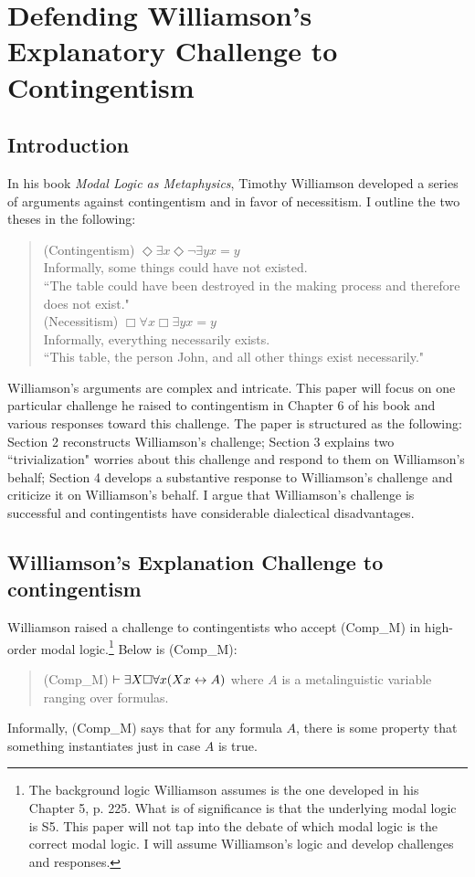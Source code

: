 \chapter{Defending Williamson's Explanatory Challenge to Contingentism}

\section{Introduction}
In his book \emph{Modal Logic as Metaphysics}, Timothy Williamson developed a series of arguments against contingentism and in favor of necessitism. I outline the two theses in the following: 
\begin{quote}

(Contingentism) $\Diamond \exists x \Diamond \neg \exists y x=y$ \\
Informally, some things could have not existed. \\
``The table could have been destroyed in the making process and therefore does not exist." \\
(Necessitism) $\Box \forall x \Box \exists y x=y$  \\
Informally, everything necessarily exists. \\
``This table, the person John, and all other things exist necessarily."
\end{quote}
Williamson's arguments are complex and intricate. This paper will focus on one particular challenge he raised to contingentism in Chapter 6 of his book and various responses toward this challenge. The paper is structured as the following: Section 2 reconstructs Williamson's challenge; Section 3 explains two ``trivialization" worries about this challenge and respond to them on Williamson's behalf; Section 4 develops a substantive response to Williamson's challenge and criticize it on Williamson's behalf. I argue that Williamson's challenge is successful and contingentists have considerable dialectical disadvantages.  

\section{Williamson's Explanation Challenge to contingentism}
Williamson raised a challenge to contingentists who accept (Comp_M) in high-order modal logic.\footnote{The background logic Williamson assumes is the one developed in his Chapter 5, p. 225. What is of significance is that the underlying modal logic is S5. This paper will not tap into the debate of which modal logic is the correct modal logic. I will assume Williamson's logic and develop challenges and responses.}
Below is (Comp_M): 
\begin{quote}
(Comp_M) $\vdash \exists X \Box \forall x (Xx \leftrightarrow A)$ where $A$ is a metalinguistic variable ranging over formulas. 
\end{quote}
Informally, (Comp_M) says that for any formula $A$, there is some property that something instantiates just in case $A$ is true.

